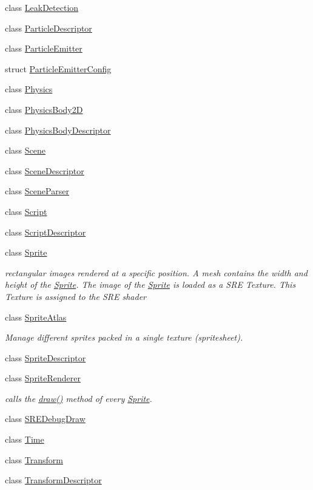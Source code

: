 \begin{DoxyCompactItemize}
\item 
class \hyperlink{class_mason_1_1_leak_detection}{Leak\+Detection}
\item 
class \hyperlink{class_mason_1_1_particle_descriptor}{Particle\+Descriptor}
\item 
class \hyperlink{class_mason_1_1_particle_emitter}{Particle\+Emitter}
\item 
struct \hyperlink{struct_mason_1_1_particle_emitter_config}{Particle\+Emitter\+Config}
\item 
class \hyperlink{class_mason_1_1_physics}{Physics}
\item 
class \hyperlink{class_mason_1_1_physics_body2_d}{Physics\+Body2D}
\item 
class \hyperlink{class_mason_1_1_physics_body_descriptor}{Physics\+Body\+Descriptor}
\item 
class \hyperlink{class_mason_1_1_scene}{Scene}
\item 
class \hyperlink{class_mason_1_1_scene_descriptor}{Scene\+Descriptor}
\item 
class \hyperlink{class_mason_1_1_scene_parser}{Scene\+Parser}
\item 
class \hyperlink{class_mason_1_1_script}{Script}
\item 
class \hyperlink{class_mason_1_1_script_descriptor}{Script\+Descriptor}
\item 
class \hyperlink{class_mason_1_1_sprite}{Sprite}
\begin{DoxyCompactList}\small\item\em rectangular images rendered at a specific position. A mesh contains the width and height of the \hyperlink{class_mason_1_1_sprite}{Sprite}. The image of the \hyperlink{class_mason_1_1_sprite}{Sprite} is loaded as a S\+RE Texture. This Texture is assigned to the S\+RE shader \end{DoxyCompactList}\item 
class \hyperlink{class_mason_1_1_sprite_atlas}{Sprite\+Atlas}
\begin{DoxyCompactList}\small\item\em Manage different sprites packed in a single texture (spritesheet). \end{DoxyCompactList}\item 
class \hyperlink{class_mason_1_1_sprite_descriptor}{Sprite\+Descriptor}
\item 
class \hyperlink{class_mason_1_1_sprite_renderer}{Sprite\+Renderer}
\begin{DoxyCompactList}\small\item\em calls the \hyperlink{class_mason_1_1_sprite_renderer_aeeeaa7eb5c340b7c2abad3d4785fd1e1}{draw()} method of every \hyperlink{class_mason_1_1_sprite}{Sprite}. \end{DoxyCompactList}\item 
class \hyperlink{class_mason_1_1_s_r_e_debug_draw}{S\+R\+E\+Debug\+Draw}
\item 
class \hyperlink{class_mason_1_1_time}{Time}
\item 
class \hyperlink{class_mason_1_1_transform}{Transform}
\item 
class \hyperlink{class_mason_1_1_transform_descriptor}{Transform\+Descriptor}
\end{DoxyCompactItemize}
